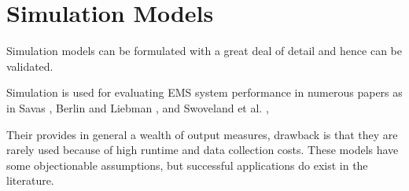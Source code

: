 \section{Simulation Models}
Simulation models
can be formulated with a great deal of detail
and hence can be validated.

Simulation
is used for evaluating EMS system performance in numerous papers
as in Savas \cite{savas1969simulation},
Berlin and Liebman \cite{berlin1974mathematical},
and Swoveland et al. \cite{swoveland1973simulation},

Their provides in general
a wealth of output measures,
drawback is that
they are rarely used
because of high runtime and data collection costs.
These models have some objectionable assumptions,
but successful applications do exist in the literature.
